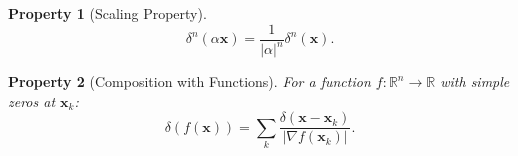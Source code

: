 \documentclass{article}
\theoremstyle{1}
\newtheorem{property}{Property}
\theoremstyle{2}
\begin{document}
\begin{property}[Scaling Property]
    \begin{equation}
        \delta^n(\alpha \mathbf{x})=\frac{1}{\left|\alpha\right|^n}\delta^n(\mathbf{x}).
    \end{equation}
\end{property}
\begin{property}[Composition with Functions]
    For a function $f:\mathbb{R}^n\longrightarrow \mathbb{R}$ with simple zeros at $\mathbf{x}_k$:
    \begin{equation}
        \delta(f(\mathbf{x}))=\sum_{k}\frac{\delta(\mathbf{x-x}_k)}{\left|\nabla f(\mathbf{x}_k)\right|}.
    \end{equation}
\end{property}
\end{document}
